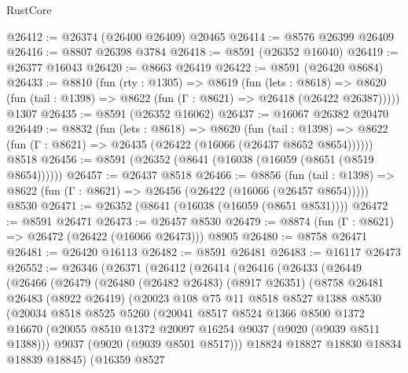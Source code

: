 \begin{lexlean}{RustCore}
\begin{coremodule}
@26412 := @26374 (@26400 @26409) @20465
@26414 := @8576 @26399 @26409
@26416 := @8807 @26398 @3784
@26418 := @8591 (@26352 @16040)
@26419 := @26377 @16043
@26420 := @8663 @26419
@26422 := @8591 (@26420 @8684)
@26433 := @8810
    (fun (rty : @1305) =>
    @8619
      (fun (lets : @8618) =>
      @8620 (fun (tail : @1398) => @8622 (fun (Γ : @8621) => @26418 (@26422 @26387)))))
    @1307
@26435 := @8591 (@26352 @16062)
@26437 := @16067 @26382 @20470
@26449 := @8832
    (fun (lets : @8618) =>
    @8620
      (fun (tail : @1398) =>
      @8622 (fun (Γ : @8621) => @26435 (@26422 (@16066 (@26437 @8652 @8654))))))
    @8518
@26456 := @8591 (@26352 (@8641 (@16038 (@16059 (@8651 (@8519 @8654))))))
@26457 := @26437 @8518
@26466 := @8856
    (fun (tail : @1398) => @8622 (fun (Γ : @8621) => @26456 (@26422 (@16066 (@26457 @8654)))))
    @8530
@26471 := @26352 (@8641 (@16038 (@16059 (@8651 @8531))))
@26472 := @8591 @26471
@26473 := @26457 @8530
@26479 := @8874 (fun (Γ : @8621) => @26472 (@26422 (@16066 @26473))) @8905
@26480 := @8758 @26471
@26481 := @26420 @16113
@26482 := @8591 @26481
@26483 := @16117 @26473
@26552 := @26346
    (@26371
      (@26412
        (@26414
          (@26416
            (@26433
              (@26449
                (@26466
                  (@26479
                    (@26480
                      (@26482 @26483)
                      (@8917 @26351)
                      (@8758
                        @26481
                        @26483
                        (@8922 @26419)
                        (@20023
                          @108
                          @75
                          @11
                          @8518
                          @8527
                          @1388
                          @8530
                          (@20034
                            @8518
                            @8525
                            @5260
                            (@20041
                              @8517
                              @8524
                              @1366
                              @8500
                              @1372
                              @16670
                              (@20055 @8510 @1372 @20097 @16254 @9037 (@9020 (@9039 @8511 @1388)))
                              @9037
                              (@9020 (@9039 @8501 @8517)))
                            @18824
                            @18827
                            @18830
                            @18834
                            @18839
                            @18845)
                          (@16359
                            @8527

\end{coremodule}
\end{lexlean}
